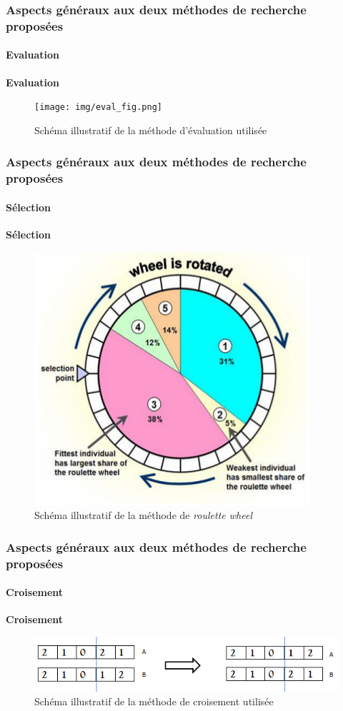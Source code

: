 \documentclass[11pt]{beamer}
\begin{document}
  \begin{frame}
 \frametitle{Aspects généraux aux deux méthodes de recherche proposées}
 \framesubtitle{Evaluation}
 
 \textbf{Evaluation}
	\begin{figure}[!h]
		\begin{center}
			\texttt{[image: img/eval\_fig.png]}
			\caption{Schéma illustratif de la méthode d'évaluation utilisée}
		\end{center}
 \end{figure}
	
 \end{frame} 
 
 \begin{frame}
 \frametitle{Aspects généraux aux deux méthodes de recherche proposées}
 \framesubtitle{Sélection}
	
	\textbf{Sélection}
	\begin{figure}[!h]
		\begin{center}
			\includegraphics[scale=.5
			]{img/wheel_fig.png}
			\caption{Schéma illustratif de la méthode de \emph{roulette wheel}}
		\end{center}
 \end{figure}
	
 \end{frame}
 
 \begin{frame}
 \frametitle{Aspects généraux aux deux méthodes de recherche proposées}
 \framesubtitle{Croisement}
	
	\textbf{Croisement}
	\begin{figure}[!h]
		\begin{center}
			\includegraphics[scale=.5
			]{img/cross_over_fig.png}
			\caption{Schéma illustratif de la méthode de croisement utilisée}
		\end{center}
 \end{figure}
	
 \end{frame}
 
\end{document}
